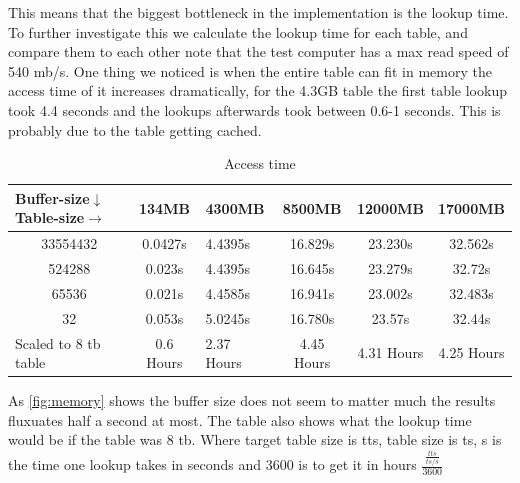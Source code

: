 This means that the biggest bottleneck in the implementation is the lookup time. To further investigate this we calculate the lookup time for each table, and compare them to each other note that the test computer has a max read speed of 540 mb/s. One thing we noticed is when the entire table can fit in memory the access time of it increases dramatically, for the 4.3GB table the first table lookup took 4.4 seconds and the lookups afterwards took between 0.6-1 seconds. This is probably due to the table getting cached.
\begin{table}[H]
\centering
\caption{Access time}
\label{tab:memory}
\begin{tabular}{|c|clccc}
\hline
\multicolumn{1}{|l|}{Buffer-size$\downarrow$ Table-size$\rightarrow$}& \multicolumn{1}{c|}{134MB} & \multicolumn{1}{l|}{4300MB} & \multicolumn{1}{c|}{8500MB} & \multicolumn{1}{c|}{12000MB} & \multicolumn{1}{l|}{17000MB} \\ \hline
33554432                                     & 0.0427s                    & 4.4395s                     & 16.829s                     & 23.230s                      & 32.562s                      \\ \cline{1-1}
524288                                       & 0.023s                     & 4.4395s                     & 16.645s                     & 23.279s                      & 32.72s                       \\ \cline{1-1}
65536                                        & 0.021s                     & 4.4585s                     & 16.941s                     & 23.002s                      & 32.483s                      \\ \cline{1-1}
32                                           & 0.053s                     & 5.0245s                     & 16.780s                     & 23.57s                       & 32.44s                       \\ \cline{1-1}
\multicolumn{1}{|l|}{Scaled to 8 tb table}   & 0.6 Hours                  & 2.37 Hours                  & 4.45 Hours                   & 4.31 Hours                   & 4.25 Hours                   \\ \cline{1-1}
\end{tabular}
\end{table}
As \ref{fig:memory} shows the buffer size does not seem to matter much the results fluxuates half a second at most.
The table also shows what the lookup time would be if the table was 8 tb. Where target table size is tts, table size is ts, s is the time one lookup takes in seconds and 3600 is to get it in hours $\frac{\frac{tts}{ts/s}}{3600}$
